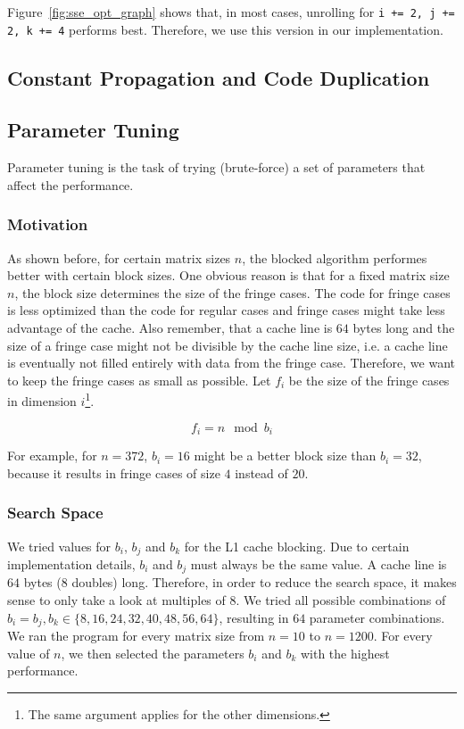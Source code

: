 \documentclass[12pt]{article}
\begin{document}
Figure~\ref{fig:sse_opt_graph} shows that, in most cases, unrolling for \lstinline{i += 2, j += 2, k += 4} performs best. Therefore, we use this version in our implementation.

\subsection{Constant Propagation and Code Duplication}

\subsection{Parameter Tuning}
Parameter tuning is the task of trying (brute-force) a set of parameters that affect the performance.

\subsubsection{Motivation}
As shown before, for certain matrix sizes $n$, the blocked algorithm performes better with certain block sizes. One obvious reason is that for a fixed matrix size $n$, the block size determines the size of the fringe cases. The code for fringe cases is less optimized than the code for regular cases and fringe cases might take less advantage of the cache. Also remember, that a cache line is $64$ bytes long and the size of a fringe case might not be divisible by the cache line size, i.e. a cache line is eventually not filled entirely with data from the fringe case. Therefore, we want to keep the fringe cases as small as possible. Let $f_i$ be the size of the fringe cases in dimension $i$\footnote{The same argument applies for the other dimensions.}. 

$$f_i = n \mod b_i$$

For example, for $n=372$, $b_i=16$ might be a better block size than $b_i=32$, because it results in fringe cases of size $4$ instead of $20$.

\subsubsection{Search Space}
We tried values for $b_i$, $b_j$ and $b_k$ for the L1 cache blocking. Due to certain implementation details, $b_i$ and $b_j$ must always be the same value. A cache line is $64$ bytes ($8$ doubles) long. Therefore, in order to reduce the search space, it makes sense to only take a look at multiples of $8$. We tried all possible combinations of $b_i=b_j, b_k \in \{8, 16, 24, 32, 40, 48, 56, 64\}$, resulting in $64$ parameter combinations. We ran the program for every matrix size from $n=10$ to $n=1200$. For every value of $n$, we then selected the parameters $b_i$ and $b_k$ with the highest performance. 
\end{document}
